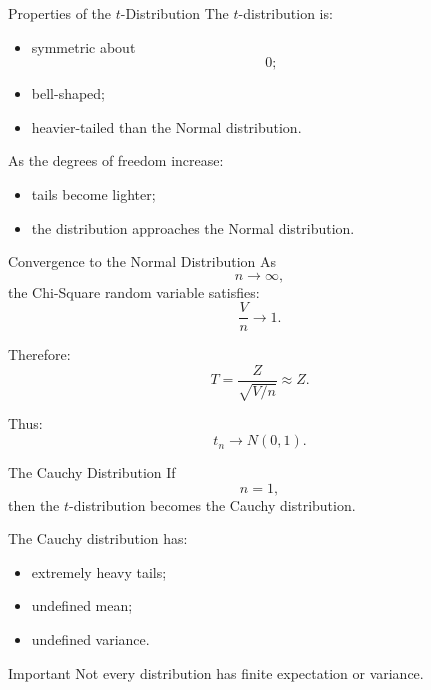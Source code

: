 \begin{frame}{Properties of the \(t\)-Distribution}
The \(t\)-distribution is:
\begin{itemize}
    \item symmetric about
    \[
    0;
    \]

    \item bell-shaped;

    \item heavier-tailed than the Normal distribution.
\end{itemize}

\vspace{0.25cm}

As the degrees of freedom increase:
\begin{itemize}
    \item tails become lighter;
    \item the distribution approaches the Normal distribution.
\end{itemize}
\end{frame}

\begin{frame}{Convergence to the Normal Distribution}
As
\[
n\to\infty,
\]
the Chi-Square random variable satisfies:
\[
\frac{V}{n}\to1.
\]

Therefore:
\[
T
=
\frac{
Z
}{
\sqrt{V/n}
}
\approx Z.
\]

Thus:
\[
\boxed{
t_n
\to
N(0,1).
}
\]
\end{frame}

\begin{frame}{The Cauchy Distribution}
If
\[
n=1,
\]
then the \(t\)-distribution becomes the Cauchy distribution.

\vspace{0.25cm}

The Cauchy distribution has:
\begin{itemize}
    \item extremely heavy tails;
    \item undefined mean;
    \item undefined variance.
\end{itemize}

\vspace{0.25cm}

\begin{keybox}{Important}
Not every distribution has finite expectation or variance.
\end{keybox}
\end{frame}

